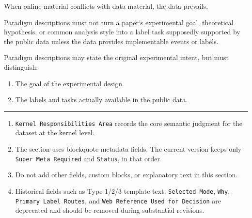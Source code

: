 \begin{tcolorbox}
\noindent When online material conflicts with data material, the data prevails.\par\smallskip

\smallskip{}\par\smallskip

\noindent Paradigm descriptions must not turn a paper`s experimental goal, theoretical hypothesis, or common analysis style into a label task supposedly supported by the public data unless the data provides implementable events or labels.\par\smallskip

\smallskip{}\par\smallskip

\noindent Paradigm descriptions may state the original experimental intent, but must distinguish:\par\smallskip

\begin{enumerate}[leftmargin=1.5em,noitemsep,topsep=2pt]
\item The goal of the experimental design.
\item The labels and tasks actually available in the public data.
\end{enumerate}

\medskip{}
\par\nopagebreak\noindent\rule{\linewidth}{0.4pt}\par\smallskip

\smallskip{}\par\smallskip

\begin{enumerate}[leftmargin=1.5em,noitemsep,topsep=2pt]
\item \texttt{Kernel Responsibilities Area} records the core semantic judgment for the dataset at the kernel level.
\item The section uses blockquote metadata fields. The current version keeps only \texttt{Super Meta Required} and \texttt{Status}, in that order.
\item Do not add other fields, custom blocks, or explanatory text in this section.
\item Historical fields such as Type 1/2/3 template text, \texttt{Selected Mode}, \texttt{Why}, \texttt{Primary Label Routes}, and \texttt{Web Reference Used for Decision} are deprecated and should be removed during substantial revisions.
\end{enumerate}


\end{tcolorbox}
